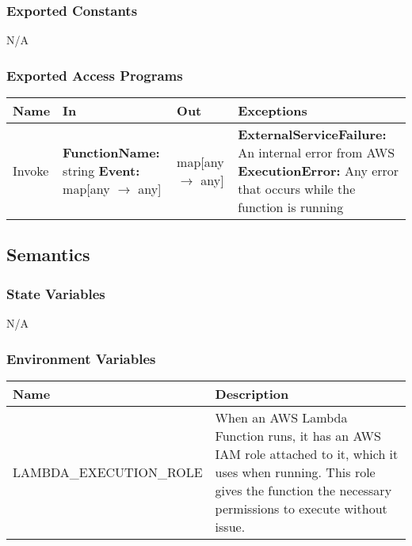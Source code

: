 \documentclass[12pt, titlepage]{article}
\begin{document}
\subsubsection{Exported Constants}

N/A

\subsubsection{Exported Access Programs}

\begin{center}
  \begin{tabular}{>{\raggedright}p{3cm} >{\raggedright}p{5cm}
    >{\raggedright}p{4cm} p{4cm}}
    \hline
    \textbf{Name} & \textbf{In} & \textbf{Out} & \textbf{Exceptions} \\
    \hline
    Invoke & \textbf{FunctionName:} string \newline \textbf{Event:}
    map[any $\rightarrow$ any] & map[any $\rightarrow$ any] &
    \textbf{ExternalServiceFailure:} An internal error from AWS
    \newline \textbf{ExecutionError:} Any error that occurs while the
    function is running \\
    \hline
  \end{tabular}
\end{center}

\subsection{Semantics}

\subsubsection{State Variables}

N/A

\subsubsection{Environment Variables}

\begin{center}
  \begin{tabular}{p{6cm} p{10cm}}
    \hline
    \textbf{Name} & \textbf{Description} \\
    \hline
    LAMBDA\_EXECUTION\_ROLE & When an AWS Lambda Function runs, it
    has an AWS IAM role attached to it, which it uses when running.
    This role gives the function the necessary permissions to execute
    without issue. \\
    \hline
  \end{tabular}
\end{center}
\end{document}
